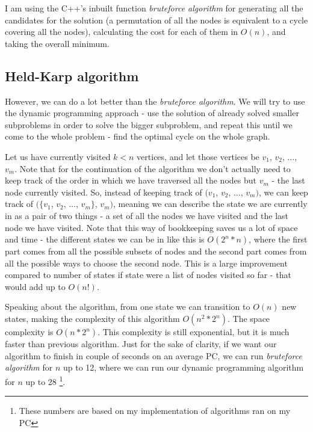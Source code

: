 \documentclass[12pt,twoside,notitlepage]{report}
\begin{document}
I am using the C++'s inbuilt function {\it bruteforce algorithm} for generating all the candidates for the solution (a permutation of all the nodes is equivalent to a cycle covering all the nodes), calculating the cost for each of them in $ O(n) $, and taking the overall minimum.

\subsection{Held-Karp algorithm} %

However, we can do a lot better than the {\it bruteforce algorithm}. We will try to use the dynamic programming approach - use the solution of already solved smaller subproblems in order to solve the bigger subproblem, and repeat this until we come to the whole problem - find the optimal cycle on the whole graph. 

\smallskip

Let us have currently visited $k < n$ vertices, and let those vertices be $v_{1}$, $v_{2}$, $\dots$, $v_{m}$. Note that for the continuation of the algorithm we don't actually need to keep track of the order in which we have traversed all the nodes but $v_{m}$ - the last node currently visited. So, instead of keeping track of $(v_{1}$, $v_{2}$, $\dots$, $v_{m})$, we can keep track of $(\{v_{1}$, $v_{2}$, $\dots$, $v_{m}\}$, $v_{m})$, meaning we can describe the state we are currently in as a pair of two things - a set of all the nodes we have visited and the last node we have visited. Note that this way of bookkeeping saves us a lot of space and time - the different states we can be in like this is $O(2^{n} * n)$, where the first part comes from all the possible subsets of nodes and the second part comes from all the possible ways to choose the second node. This is a large improvement compared to number of states if state were a list of nodes visited so far - that would add up to $O(n!)$.

\smallskip

Speaking about the algorithm, from one state we can transition to $O(n)$ new states, making the complexity of this algorithm $O(n^2 * 2^n)$. The space complexity is $O(n * 2^n)$. This complexity is still exponential, but it is much faster than previous algorithm. Just for the sake of clarity, if we want our algorithm to finish in couple of seconds on an average PC, we can run {\it bruteforce algorithm} for $n$ up to 12, where we can run our dynamic programming algorithm for $n$ up to 28 \footnote{These numbers are based on my implementation of algorithms ran on my PC}.
\end{document}
